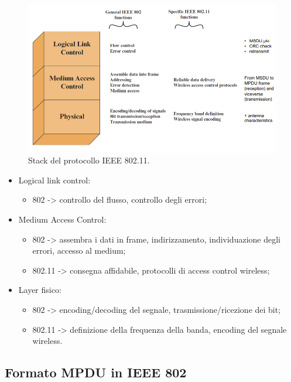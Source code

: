 \begin{figure}[h]
    \centering
    \includegraphics[width=1\textwidth]{images/chapter6/6-2.png}
    \caption{Stack del protocollo IEEE 802.11.}
    \label{fig:6-2}
\end{figure}

\begin{itemize}
    \item Logical link control:
	\begin{itemize}
	    \item 802 -> controllo del flusso, controllo degli errori;
	\end{itemize}
	\item Medium Access Control:
	\begin{itemize}
	    \item 802 -> assembra i dati in frame, indirizzamento, individuazione degli errori, accesso al medium;
		\item 802.11 -> consegna affidabile, protocolli di access control wireless;
	\end{itemize}
	\item Layer fisico:
	\begin{itemize}
	    \item 802 -> encoding/decoding del segnale, trasmissione/ricezione dei bit;
		\item 802.11 -> definizione della frequenza della banda, encoding del segnale wireless.
	\end{itemize}
\end{itemize}

\subsection{Formato MPDU in IEEE 802}

